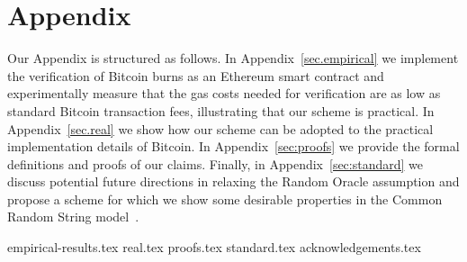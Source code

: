 \section*{Appendix}

Our Appendix is structured as follows. In Appendix~\ref{sec.empirical}
we implement the verification of Bitcoin burns
as an Ethereum smart contract and experimentally measure that the gas costs needed for
verification are as low as standard Bitcoin transaction fees, illustrating
that our scheme is practical. In Appendix~\ref{sec.real} we show how
our scheme can be adopted to the practical implementation details of Bitcoin.
In Appendix~\ref{sec:proofs} we provide the formal definitions and proofs of our
claims. Finally, in Appendix~\ref{sec:standard}
we discuss potential future directions in relaxing the Random Oracle assumption
and propose a scheme for which we show some desirable properties in
the Common Random String model~\cite{STOC:BluFelMic88}.

{empirical-results.tex}
{real.tex}
{proofs.tex}
{standard.tex}
{acknowledgements.tex}
